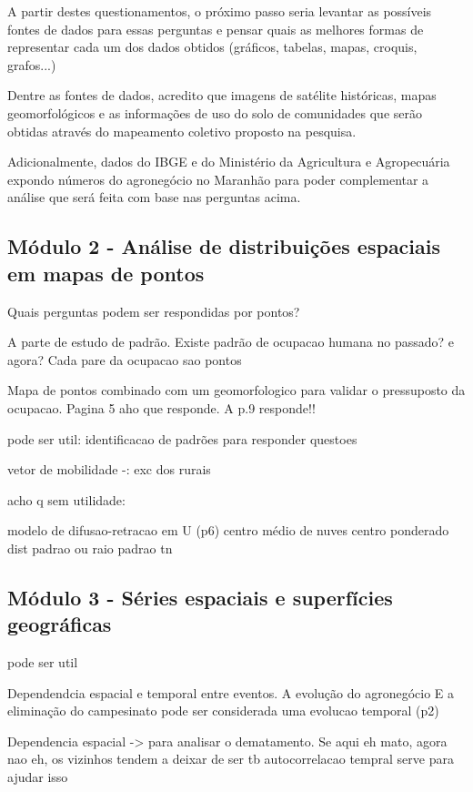A partir destes questionamentos, o próximo passo seria levantar as possíveis fontes de dados para essas perguntas e pensar quais as melhores formas de representar cada um dos dados obtidos (gráficos, tabelas, mapas, croquis, grafos...)

Dentre as fontes de dados, acredito que imagens de satélite históricas, mapas geomorfológicos e as informações de uso do solo de comunidades que serão obtidas através do mapeamento coletivo proposto na pesquisa.

Adicionalmente, dados do IBGE e do Ministério da Agricultura e Agropecuária expondo números do agronegócio no Maranhão para poder complementar a análise que será feita com base nas perguntas acima.

\subsection{Módulo 2 - Análise de distribuições espaciais em mapas de pontos}


Quais perguntas podem ser respondidas por pontos?

A parte de estudo de padrão. Existe padrão de ocupacao humana no passado? e agora? 
Cada pare da ocupacao sao pontos

Mapa de pontos combinado com um geomorfologico para validar o pressuposto da ocupacao. Pagina 5 aho que responde. A p.9 responde!!

pode ser util:
identificacao de padrões para responder questoes



vetor de mobilidade -: exc dos rurais

acho q sem utilidade:

modelo de difusao-retracao em U (p6)
centro médio de nuves
centro ponderado
dist padrao ou raio padrao tn


\subsection{Módulo 3 - Séries espaciais e superfícies geográficas}

pode ser util

Dependendcia espacial e temporal entre eventos. 
A evolução do agronegócio E a eliminação do campesinato pode ser considerada uma evolucao temporal (p2)

Dependencia espacial -> para analisar o dematamento. Se aqui eh mato, agora nao eh, os vizinhos tendem a deixar de ser tb
autocorrelacao tempral serve para ajudar isso

